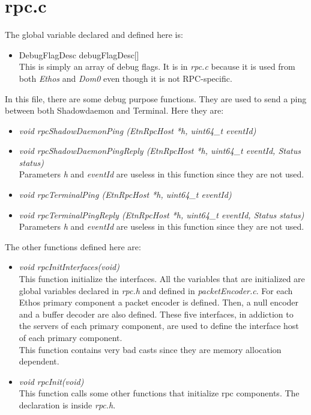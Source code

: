 \section{rpc.c}

The global variable declared and defined here is:

\begin{itemize}
\item DebugFlagDesc debugFlagDesc[]\\
This is simply an array of debug flags. It is in \emph{rpc.c} because it is used from both \emph{Ethos} and \emph{Dom0} even though it is not RPC-specific. 
\end{itemize}
In this file, there are some debug purpose functions. They are used to send a ping between both Shadowdaemon and Terminal. Here they are:
\begin{itemize}
\item \emph{void rpcShadowDaemonPing (EtnRpcHost *h, uint64\_t eventId)}\\
\item \emph{void rpcShadowDaemonPingReply (EtnRpcHost *h, uint64\_t eventId, Status status)}\\
Parameters \emph{h} and \emph{eventId} are useless in this function since they are not used.
\item \emph{void rpcTerminalPing (EtnRpcHost *h, uint64\_t eventId)}\\
\item \emph{void rpcTerminalPingReply (EtnRpcHost *h, uint64\_t eventId, Status status)}\\
Parameters \emph{h} and \emph{eventId} are useless in this function since they are not used.
\end{itemize}
The other functions defined here are:

\begin{itemize}
\item \emph{void rpcInitInterfaces(void)}\\
This function initialize the interfaces. All the variables that are initialized are global variables declared in \emph{rpc.h} and defined in \emph{packetEncoder.c}. For each Ethos primary component a packet encoder is defined. Then, a null encoder and a buffer decoder are also defined. These five interfaces, in addiction to the servers of each primary component, are used to define the interface host of each primary component.\\
This function contains very bad casts since they are memory allocation dependent.
\item \emph{void rpcInit(void)}\\
This function calls some other functions that initialize rpc components. The declaration is inside \emph{rpc.h}.
\end{itemize}